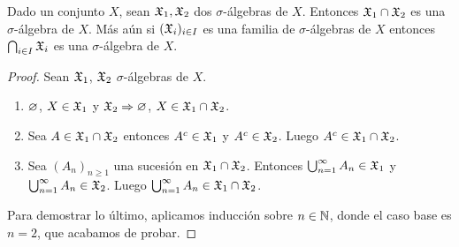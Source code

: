 \begin{lemma}
    Dado un conjunto \(X\), sean \(\mathfrak{X}_1, \mathfrak{X}_2\) dos \(\sigma\)-álgebras de \(X\). Entonces \(\mathfrak{X}_1 \cap \mathfrak{X}_2\) es una \(\sigma\)-álgebra de \(X\).
    Más aún si \((\mathfrak{X}_i)_{i \in I}\) es una familia de \(\sigma\)-álgebras de \(X\) entonces \(\bigcap_{i \in I} \mathfrak{X}_i\) es una \(\sigma\)-álgebra de \(X\).
    \begin{proof}
        Sean \(\mathfrak{X}_1\), \(\mathfrak{X}_2\) \(\sigma\)-álgebras de \(X\).
        \begin{enumerate}
            \item \(\varnothing\), \(X \in \mathfrak{X}_1\) y \(\mathfrak{X}_2 \Rightarrow \varnothing\), \(X \in \mathfrak{X}_1 \cap \mathfrak{X}_2\).
            \item Sea \(A \in \mathfrak{X}_1 \cap \mathfrak{X}_2\) entonces \(A^c \in \mathfrak{X}_1\) y \(A^c \in \mathfrak{X}_2\).
                  Luego \(A^c \in \mathfrak{X}_1 \cap \mathfrak{X}_2\).
            \item Sea \((A_n)_{n \geq 1}\) una sucesión en \(\mathfrak{X}_1 \cap \mathfrak{X}_2\). Entonces \(\bigcup_{n=1}^{\infty} A_n \in \mathfrak{X}_1\) y \(\bigcup_{n=1}^{\infty} A_n \in \mathfrak{X}_2\).
                  Luego \(\bigcup_{n=1}^{\infty} A_n \in \mathfrak{X}_1 \cap \mathfrak{X}_2\).
        \end{enumerate}
        Para demostrar lo último, aplicamos inducción sobre \(n \in \mathbb{N}\), donde el caso base es \(n = 2\), que acabamos de probar.
    \end{proof}
\end{lemma}

